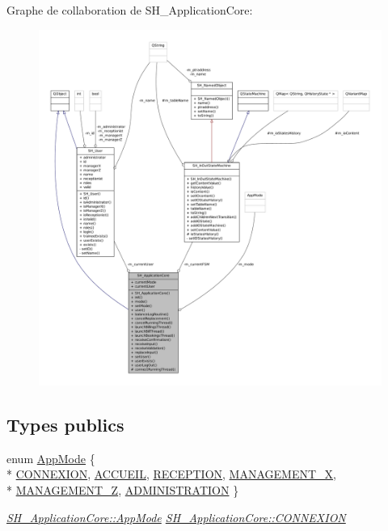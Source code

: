 Graphe de collaboration de S\-H\-\_\-\-Application\-Core\-:\nopagebreak
\begin{figure}[H]
\begin{center}
\leavevmode
\includegraphics[width=350pt]{classSH__ApplicationCore__coll__graph}
\end{center}
\end{figure}
\subsection*{Types publics}
\begin{DoxyCompactItemize}
\item 
enum \hyperlink{classSH__ApplicationCore_a6b93b2f83a290305f282616eb2935899}{App\-Mode} \{ \\*
\hyperlink{classSH__ApplicationCore_a6b93b2f83a290305f282616eb2935899a3594de687d70f634e91ef60a63b74172}{C\-O\-N\-N\-E\-X\-I\-O\-N}, 
\hyperlink{classSH__ApplicationCore_a6b93b2f83a290305f282616eb2935899a1892b908076a0887805e80f590ecdef4}{A\-C\-C\-U\-E\-I\-L}, 
\hyperlink{classSH__ApplicationCore_a6b93b2f83a290305f282616eb2935899a16687d65e8feb3b768ff655d73a45916}{R\-E\-C\-E\-P\-T\-I\-O\-N}, 
\hyperlink{classSH__ApplicationCore_a6b93b2f83a290305f282616eb2935899ae3d0d6045024cbde467f9c8cb536c6a8}{M\-A\-N\-A\-G\-E\-M\-E\-N\-T\-\_\-\-X}, 
\\*
\hyperlink{classSH__ApplicationCore_a6b93b2f83a290305f282616eb2935899ad68aea91f508ecc6cc9fe1430ddccaf1}{M\-A\-N\-A\-G\-E\-M\-E\-N\-T\-\_\-\-Z}, 
\hyperlink{classSH__ApplicationCore_a6b93b2f83a290305f282616eb2935899a110d50af3f0d2f505021620359b6163b}{A\-D\-M\-I\-N\-I\-S\-T\-R\-A\-T\-I\-O\-N}
 \}
\begin{DoxyCompactList}\small\item\em \hyperlink{classSH__ApplicationCore_a6b93b2f83a290305f282616eb2935899}{S\-H\-\_\-\-Application\-Core\-::\-App\-Mode} \hyperlink{classSH__ApplicationCore_a6b93b2f83a290305f282616eb2935899a3594de687d70f634e91ef60a63b74172}{S\-H\-\_\-\-Application\-Core\-::\-C\-O\-N\-N\-E\-X\-I\-O\-N} \end{DoxyCompactList}\end{DoxyCompactItemize}
